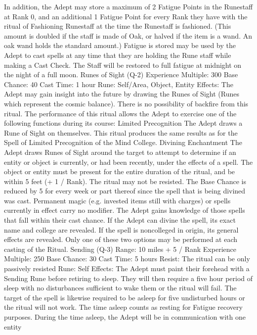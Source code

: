 \documentclass[a4paper]{article}
\begin{document}
\begin{multicols}{3}
In addition, the Adept may store a maximum of 2
Fatigue Points in the Runestaff at Rank 0, and an
additional 1 Fatigue Point for every Rank they
have with the ritual of Fashioning Runestaff at the
time the Runestaff is fashioned. (This amount is
doubled if the staff is made of Oak, or halved if the
item is a wand. An oak wand holds the standard
amount.) Fatigue is stored may be used by the
Adept to cast spells at any time that they are holding the Rune staff while making a Cast Check. The
Staff will be restored to full fatigue at midnight on
the night of a full moon.
Runes of Sight (Q-2)
Experience Multiple: 300
Base Chance: 40%
Cast Time: 1 hour
Rune: Self/Area, Object, Entity
Effects: The Adept may gain insight into the future
by drawing the Runes of Sight (Runes which represent the cosmic balance). There is no possibility of
backfire from this ritual. The performance of this
ritual allows the Adept to exercise one of the following functions during its course:
Limited Precognition The Adept draws a Rune of
Sight on themselves. This ritual produces the same
results as for the Spell of Limited Precognition of
the Mind College.
Divining Enchantment The Adept draws Runes of
Sight around the target to attempt to determine if
an entity or object is currently, or had been recently, under the effects of a spell. The object or
entity must be present for the entire duration of the
ritual, and be within 5 feet (+ 1 / Rank). The ritual
may not be resisted. The Base Chance is reduced
by 5 for every week or part thereof since the spell
that is being divined was cast. Permanent magic
(e.g. invested items still with charges) or spells
currently in effect carry no modifier. The Adept
gains knowledge of those spells that fall within
their cast chance.
If the Adept can divine the spell, its exact name
and college are revealed. If the spell is noncolleged in origin, its general effects are revealed.
Only one of these two options may be performed at
each casting of the Ritual.
Sending (Q-3)
Range: 10 miles + 5 / Rank
Experience Multiple: 250
Base Chance: 30%
Cast Time: 5 hours
Resist: The ritual can be only passively resisted
Rune: Self
Effects: The Adept must paint their forehead with a
Sending Rune before retiring to sleep. They will
then require a five hour period of sleep with no
disturbances sufficient to wake them or the ritual
will fail. The target of the spell is likewise required
to be asleep for five undisturbed hours or the ritual
will not work. The time asleep counts as resting for
Fatigue recovery purposes. During the time asleep,
the Adept will be in communication with one entity

\end{multicols}
\end{document}
